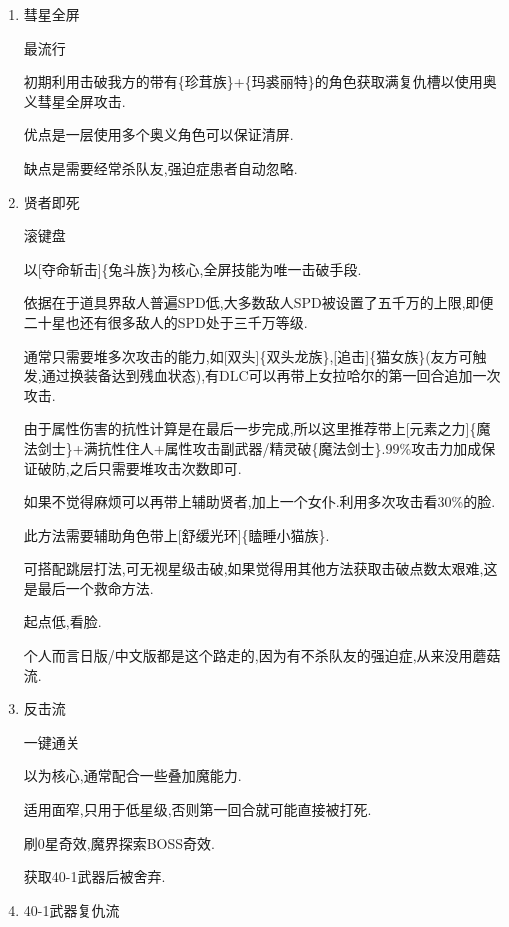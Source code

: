 	\begin{enumerate}

		\item
		彗星全屏

		最流行

		初期利用击破我方的带有{\color{red}{自我牺牲}}\{珍茸族\}+{\color{red}{惊惧死灵}}\{玛裘丽特\}的角色获取满复仇槽以使用奥义彗星全屏攻击.

		优点是一层使用多个奥义角色可以保证清屏.
		
		缺点是需要经常杀队友,强迫症患者自动忽略.

		\item
		贤者即死

		滚键盘

		以[夺命斩击]\{兔斗族\}为核心,全屏技能为唯一击破手段.

		依据在于道具界敌人普遍SPD低,大多数敌人SPD被设置了五千万的上限,即便二十星也还有很多敌人的SPD处于三千万等级.

		通常只需要堆多次攻击的能力,如[双头]\{双头龙族\},[追击]\{猫女族\}(友方可触发,通过换装备达到残血状态),有DLC可以再带上女拉哈尔的第一回合追加一次攻击.

		由于属性伤害的抗性计算是在最后一步完成,所以这里推荐带上[元素之力]\{魔法剑士\}+满抗性住人+属性攻击副武器/精灵破\{魔法剑士\}.99\%攻击力加成保证破防,之后只需要堆攻击次数即可.

		如果不觉得麻烦可以再带上辅助贤者,加上一个女仆.利用多次攻击看30\%的脸.

		此方法需要辅助角色带上[舒缓光环]\{瞌睡小猫族\}.

		可搭配跳层打法,可无视星级击破,如果觉得用其他方法获取击破点数太艰难,这是最后一个救命方法.

		起点低,看脸.

		个人而言日版/中文版都是这个路走的,因为有不杀队友的强迫症,从来没用蘑菇流.

		\item
		反击流

		一键通关

		以{\color{red}{强制反击+防御必定反击}}为核心,通常配合一些叠加魔能力.

		适用面窄,只用于低星级,否则第一回合就可能直接被打死.

		刷0星奇效,魔界探索BOSS奇效.

		获取40-1武器后被舍弃.

		{\color{red}{仍然是击破道具神的最低要求打法,参考实用魔能力章节}}

		\item
		40-1武器复仇流


\end{enumerate}
